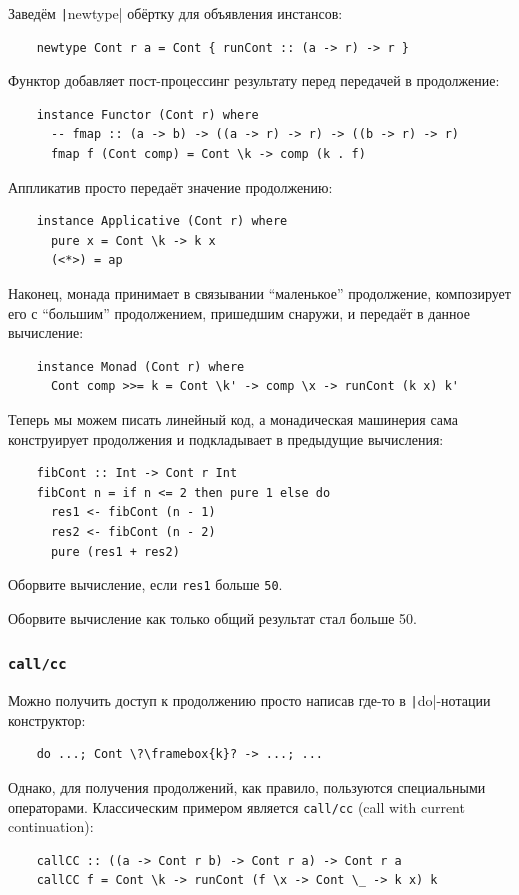 Заведём \texttt|newtype| обёртку для объявления инстансов:
\begin{verbatim}
    newtype Cont r a = Cont { runCont :: (a -> r) -> r }
\end{verbatim}

Функтор добавляет пост-процессинг результату перед передачей в продолжение:
\begin{verbatim}
    instance Functor (Cont r) where
      -- fmap :: (a -> b) -> ((a -> r) -> r) -> ((b -> r) -> r)
      fmap f (Cont comp) = Cont \k -> comp (k . f)
\end{verbatim}

Аппликатив просто передаёт значение продолжению:
\begin{verbatim}
    instance Applicative (Cont r) where
      pure x = Cont \k -> k x
      (<*>) = ap
\end{verbatim}

Наконец, монада принимает в связывании ``маленькое'' продолжение, композирует его с ``большим'' продолжением, пришедшим снаружи, и передаёт в данное вычисление:
\begin{verbatim}
    instance Monad (Cont r) where
      Cont comp >>= k = Cont \k' -> comp \x -> runCont (k x) k'
\end{verbatim}

Теперь мы можем писать линейный код, а монадическая машинерия сама конструирует продолжения и подкладывает в предыдущие вычисления:
\begin{verbatim}
    fibCont :: Int -> Cont r Int
    fibCont n = if n <= 2 then pure 1 else do
      res1 <- fibCont (n - 1)
      res2 <- fibCont (n - 2)
      pure (res1 + res2)
\end{verbatim}

\begin{task}
    Оборвите вычисление, если \texttt{res1} больше \texttt{50}.
\end{task}

\begin{task}
    Оборвите вычисление как только общий результат стал больше 50.
\end{task}

\subsubsection{\texttt{call/cc}}

Можно получить доступ к продолжению просто написав где-то в \texttt|do|-нотации конструктор:
\begin{verbatim}
    do ...; Cont \?\framebox{k}? -> ...; ...
\end{verbatim}
Однако, для получения продолжений, как правило, пользуются специальными операторами.
Классическим примером является \texttt{call/cc} (call with current continuation):
\begin{verbatim}
    callCC :: ((a -> Cont r b) -> Cont r a) -> Cont r a
    callCC f = Cont \k -> runCont (f \x -> Cont \_ -> k x) k
\end{verbatim}

